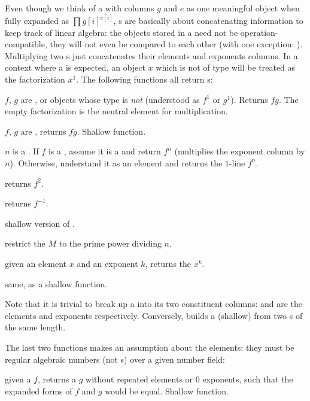 Even though we think of a  with columns $g$ and $e$
as one meaningful object when fully expanded as $\prod g[i]^{e[i]}$,
s are basically about concatenating information to keep track of
linear algebra: the objects stored in a  need not be
operation-compatible, they will not even be compared to each other (with one
exception: ). Multiplying two s just
concatenates their elements and exponents columns. In a context where a
 is expected, an object $x$ which is not of type  will be
treated as the factorization $x^1$. The following functions all return
s:

 $f$, $g$ are ,
or objects whose type is \emph{not}  (understood as $f^1$ or $g^1$).
Returns $fg$. The empty factorization is the neutral element for 
multiplication.

 $f$, $g$ are , returns
$fg$. Shallow function.

 $n$ is a . If $f$ is a ,
assume it is a  and return $f^n$ (multiplies the exponent column
by $n$). Otherwise, understand it as an element and returns the $1$-line
 $f^n$.

 returns $f^2$.

 returns $f^{-1}$.

 shallow version of .

 restrict the  $M$ to
the prime power dividing $n$.

 given an element $x$ and an exponent
$k$, returns the  $x^k$.

 same, as a shallow function.

Note that it is trivial to break up a  into its two constituent
columns:  and  are the elements and exponents
respectively. Conversely,  builds a (shallow)  from
two s of the same length.

The last two functions makes an assumption about the elements: they must be
regular algebraic numbers (not s) over a given number field:

 given a  $f$, returns a 
$g$ without repeated elements or 0 exponents, such that the expanded forms
of $f$ and $g$ would be equal. Shallow function.

